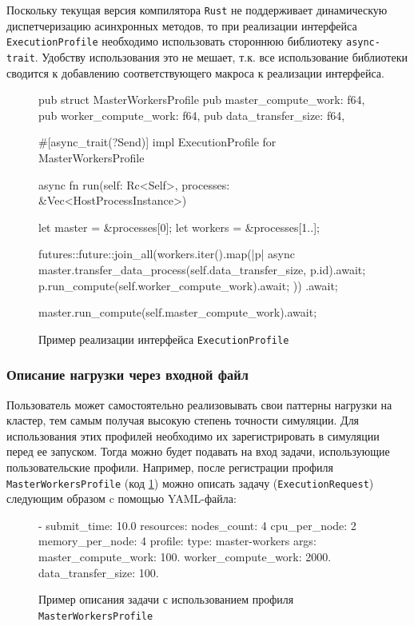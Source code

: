 Поскольку текущая версия компилятора \texttt{Rust} не поддерживает динамическую диспетчеризацию асинхронных методов, то при реализации интерфейса \texttt{ExecutionProfile} необходимо использовать стороннюю библиотеку \texttt{async-trait}\cite{rust-async-trait}. Удобству использования это не мешает, т.к. все использование библиотеки сводится к добавлению соответствующего макроса к реализации интерфейса.

\begin{figure}[h!]
    \footnotesize 
    \begin{rustcode}
pub struct MasterWorkersProfile {
  pub master_compute_work: f64,
  pub worker_compute_work: f64,
  pub data_transfer_size: f64,
}

#[async_trait(?Send)]
impl ExecutionProfile for MasterWorkersProfile {
  async fn run(self: Rc<Self>, processes: &Vec<HostProcessInstance>) {
    let master = &processes[0];
    let workers = &processes[1..];
    
    futures::future::join_all(workers.iter().map(|p| async {
      master.transfer_data_process(self.data_transfer_size, p.id).await;
      p.run_compute(self.worker_compute_work).await;
    }))
    .await;
    
    master.run_compute(self.master_compute_work).await;
  }
}
    \end{rustcode}
    \caption{Пример реализации интерфейса \texttt{ExecutionProfile}}
    \label{fig:execution-profile-impl}
\end{figure}

\subsubsection{Описание нагрузки через входной файл}

Пользователь может самостоятельно реализовывать свои паттерны нагрузки на кластер, тем самым получая высокую степень точности симуляции. Для использования этих профилей необходимо их зарегистрировать в симуляции перед ее запуском. Тогда можно будет подавать на вход задачи, использующие пользовательские профили. Например, после регистрации профиля \texttt{MasterWorkersProfile} (код \ref{fig:execution-profile-impl}) можно описать задачу (\texttt{ExecutionRequest}) следующим образом c помощью YAML-файла: 

\begin{figure}[h!]
    \footnotesize
    \begin{yamlcode}
                    - submit_time: 10.0
                      resources:
                        nodes_count: 4
                        cpu_per_node: 2
                        memory_per_node: 4
                      profile:
                        type: master-workers
                        args:
                          master_compute_work: 100. 
                          worker_compute_work: 2000. 
                          data_transfer_size: 100.
\end{yamlcode}
    \caption{Пример описания задачи с использованием профиля \texttt{MasterWorkersProfile}}
\end{figure}

